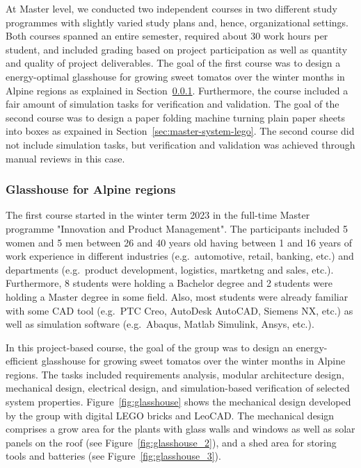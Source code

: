 \documentclass{PDS}
\begin{document}
At Master level, we conducted two independent courses in two different study programmes with slightly varied study plans and, hence, organizational settings.
Both courses spanned an entire semester, required about 30 work hours per student, and included grading based on project participation as well as quantity and quality of project deliverables.
The goal of the first course was to design a energy-optimal glasshouse for growing sweet tomatos over the winter months in Alpine regions as explained in Section~\ref{sec:master-product-lego}.
Furthermore, the course included a fair amount of simulation tasks for verification and validation.
The goal of the second course was to design a paper folding machine turning plain paper sheets into boxes as expained in Section~\ref{sec:master-system-lego}.
The second course did not include simulation tasks, but verification and validation was achieved through manual reviews in this case.

\subsubsection{Glasshouse for Alpine regions}
\label{sec:master-product-lego}

The first course started in the winter term 2023 in the full-time Master programme "Innovation and Product Management".
The participants included 5 women and 5 men between 26 and 40 years old having between 1 and 16 years of work experience in different industries (e.g.\ automotive, retail, banking, etc.) and departments (e.g.\ product development, logistics, martketng and sales, etc.).
Furthermore, 8 students were holding a Bachelor degree and 2 students were holding a Master degree in some field.
Also, most students were already familiar with some CAD tool (e.g.\ PTC Creo, AutoDesk AutoCAD, Siemens NX, etc.) as well as simulation software (e.g.\ Abaqus, Matlab Simulink, Ansys, etc.).

In this project-based course, the goal of the group was to design an energy-efficient glasshouse for growing sweet tomatos over the winter months in Alpine regions.
The tasks included requirements analysis, modular architecture design, mechanical design, electrical design, and simulation-based verification of selected system properties.
Figure~\ref{fig:glasshouse} shows the mechanical design developed by the group with digital LEGO bricks and LeoCAD.
The mechanical design comprises a grow area for the plants with glass walls and windows as well as solar panels on the roof (see Figure~\ref{fig:glasshouse_2}), and a shed area for storing tools and batteries (see Figure~\ref{fig:glasshouse_3}).
\end{document}

